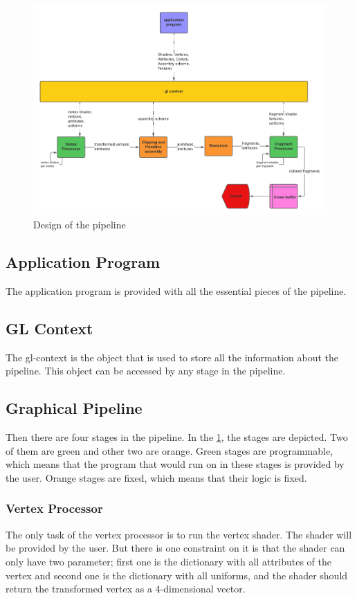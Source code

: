 \documentclass[a4paper]{article}
\theoremstyle{mytheoremstyle}
\theoremstyle{mytheoremstyle}
\theoremstyle{myproblemstyle}
\begin{document}
\begin{figure}[h]
    \includegraphics[width=\textwidth]{pipeline-design.png}
    \caption{Design of the pipeline}
    \label{pipeline}
\end{figure}

\subsection{Application Program}
The application program is provided with all the essential pieces of the pipeline.
\subsection{GL Context}
The gl-context is the object that is used to store all the information about the pipeline. This object can be accessed by any stage in the pipeline.

\subsection{Graphical Pipeline}
Then there are four stages in the pipeline. In the \ref{pipeline}, the stages are depicted. Two of them are green and other two are orange. Green stages are programmable, which means that the program that would run on in these stages is provided by the user. Orange stages are fixed, which means that their logic is fixed.

\subsubsection{Vertex Processor}
The only task of the vertex processor is to run the vertex shader. The shader will be provided by the user. But there is one constraint on it is that the shader can only have two parameter; first one is the dictionary with all attributes of the vertex and second one is the dictionary with all uniforms, and the shader should return the transformed vertex as a 4-dimensional vector.
\end{document}
